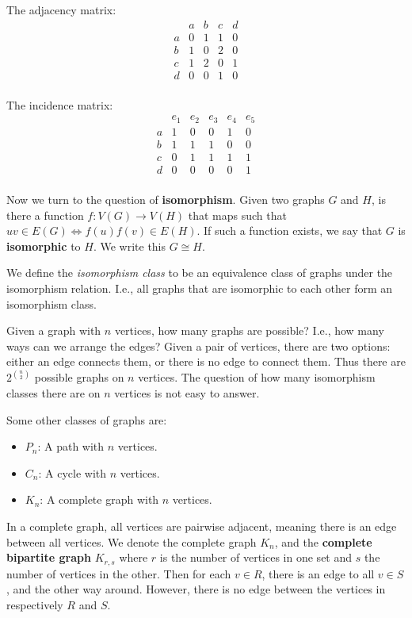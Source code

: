 The adjacency matrix:
\[
	\begin{array}{c|cccc}
		  & a & b & c & d \\
		\hline
		a & 0 & 1 & 1 & 0 \\
		b & 1 & 0 & 2 & 0 \\
		c & 1 & 2 & 0 & 1 \\
		d & 0 & 0 & 1 & 0 \\
	\end{array}
\]

\hspace{1cm} %

The incidence matrix:
\[
	\begin{array}{c|ccccc}
		  & e_1 & e_2 & e_3 & e_4 & e_5 \\
		\hline
		a & 1   & 0   & 0   & 1   & 0   \\
		b & 1   & 1   & 1   & 0   & 0   \\
		c & 0   & 1   & 1   & 1   & 1   \\
		d & 0   & 0   & 0   & 0   & 1   \\
	\end{array}
\]

Now we turn to the question of \textbf{isomorphism}. Given two graphs $G$ and $H$, is there a function $f : V(G) \rightarrow V(H)$ that maps such that $uv \in E(G) \iff f(u)f(v) \in  E(H)$. If such a function exists, we say that $G$ is \textbf{isomorphic} to $H$. We write this $G \cong H$.

We define the \textit{isomorphism class} to be an equivalence class of graphs under the isomorphism relation. I.e., all graphs that are isomorphic to each other form an isomorphism class.

Given a graph with $n$ vertices, how many graphs are possible? I.e., how many ways can we arrange the edges? Given a pair of vertices, there are two options: either an edge connects them, or there is no edge to connect them. Thus there are $2^{\binom{n}{2}}$ possible graphs on $n$ vertices. The question of how many isomorphism classes there are on $n$ vertices is not easy to answer.

Some other classes of graphs are:
\begin{itemize}
	\item $P_{n}$: A path with $n$ vertices.
	\item $C_{n}$: A cycle with $n$ vertices.
	\item $K_{n}$: A complete graph with $n$ vertices.
\end{itemize}
In a complete graph, all vertices are pairwise adjacent, meaning there is an edge between all vertices. We denote the complete graph $K_{n}$, and the \textbf{complete bipartite graph} $K_{r,s}$ where $r$ is the number of vertices in one set and $s$ the number of vertices in the other. Then for each $v \in R$, there is an edge to all $v \in S$, and the other way around. However, there is no edge between the vertices in respectively $R$ and $S$.

